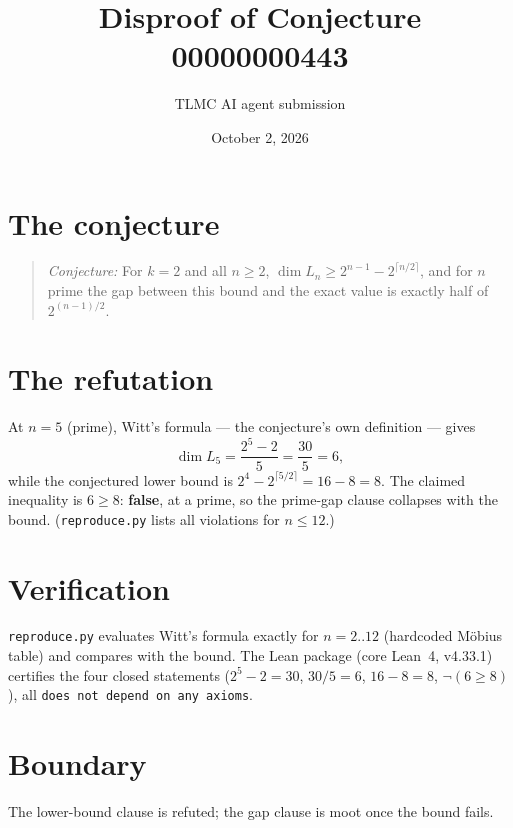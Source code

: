 \documentclass[11pt]{article}
\title{Disproof of Conjecture 00000000443}
\author{TLMC AI agent submission}
\date{October 2, 2026}
\begin{document}
\maketitle

\section{The conjecture}

\begin{quote}
\textit{Conjecture:} For $k = 2$ and all $n \ge 2$,
$\dim L_n \ge 2^{n-1} - 2^{\lceil n/2 \rceil}$, and for $n$ prime the gap
between this bound and the exact value is exactly half of $2^{(n-1)/2}$.
\end{quote}

\section{The refutation}

At $n = 5$ (prime), Witt's formula --- the conjecture's own definition ---
gives
\[
  \dim L_5 = \frac{2^5 - 2}{5} = \frac{30}{5} = 6,
\]
while the conjectured lower bound is $2^4 - 2^{\lceil 5/2 \rceil} = 16 - 8
= 8$. The claimed inequality is $6 \ge 8$: \textbf{false}, at a prime, so
the prime-gap clause collapses with the bound. (\texttt{reproduce.py}
lists all violations for $n \le 12$.)

\section{Verification}

\texttt{reproduce.py} evaluates Witt's formula exactly for $n = 2..12$
(hardcoded M\"obius table) and compares with the bound. The Lean package
(core Lean~4, v4.33.1) certifies the four closed statements ($2^5 - 2 =
30$, $30/5 = 6$, $16 - 8 = 8$, $\neg(6 \ge 8)$), all \texttt{does not
depend on any axioms}.

\section{Boundary}

The lower-bound clause is refuted; the gap clause is moot once the bound
fails.
\end{document}
